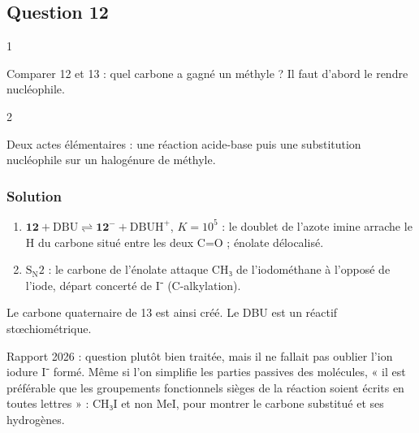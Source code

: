 \documentclass[11pt,a4paper]{article}
\providecommand{\tightlist}{\setlength{\itemsep}{0pt}\setlength{\parskip}{0pt}}
\newcommand{\equationajustee}[1]{%
  \sbox{\boiteequation}{$\displaystyle #1$}%
  \ifdim\wd\boiteequation>\linewidth
    \[\resizebox{\linewidth}{!}{\usebox{\boiteequation}}\]%
  \else
    \[#1\]%
  \fi}
\begin{document}
\hypertarget{question-12}{%
\subsection{Question 12}\label{question-12}}

\begin{indication}{1}

Comparer 12 et 13 : quel carbone a gagné un méthyle ? Il faut d'abord le rendre nucléophile.

\end{indication}

\begin{indication}{2}

Deux actes élémentaires : une réaction acide-base puis une substitution nucléophile sur un halogénure de méthyle.

\end{indication}

\hypertarget{solution-11}{%
\subsubsection{Solution}\label{solution-11}}

\begin{enumerate}
\def\labelenumi{\arabic{enumi}.}
\tightlist
\item
  \(\mathbf{12}+\mathrm{DBU}\rightleftharpoons{\mathbf{12}}^-+\mathrm{DBUH^+}\), \(K=10^5\) : le doublet de l'azote imine arrache le H du carbone situé entre les deux C=O ; énolate délocalisé.
\item
  \textbf{\(\mathrm{S_N2}\)} : le carbone de l'énolate attaque CH₃ de l'iodométhane à l'opposé de l'iode, départ concerté de I⁻ (C-alkylation).
\end{enumerate}

\equationajustee{\mathbf{12}+\mathrm{CH_3I}+\mathrm{DBU}\longrightarrow\mathbf{13}+\mathrm{DBUH^+}+\mathrm{I^-}}

Le carbone quaternaire de 13 est ainsi créé. Le DBU est un réactif stœchiométrique.

\begin{jury}

Rapport 2026 : question plutôt bien traitée, mais il ne fallait pas oublier l'ion iodure I⁻ formé. Même si l'on simplifie les parties passives des molécules, « il est préférable que les groupements fonctionnels sièges de la réaction soient écrits en toutes lettres » : CH₃I et non MeI, pour montrer le carbone substitué et ses hydrogènes.

\end{jury}
\end{document}
